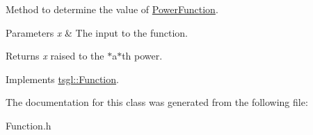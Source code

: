 Method to determine the value of \hyperlink{classtsgl_1_1_power_function}{Power\-Function}. 


\begin{DoxyParams}{Parameters}
{\em x} & The input to the function. \\
\hline
\end{DoxyParams}
\begin{DoxyReturn}{Returns}
{\itshape x} raised to the $\ast$a$\ast$th power. 
\end{DoxyReturn}


Implements \hyperlink{classtsgl_1_1_function_affb7b3b19a04efefa29a9870d666e912}{tsgl\-::\-Function}.



The documentation for this class was generated from the following file\-:\begin{DoxyCompactItemize}
\item 
Function.\-h\end{DoxyCompactItemize}
